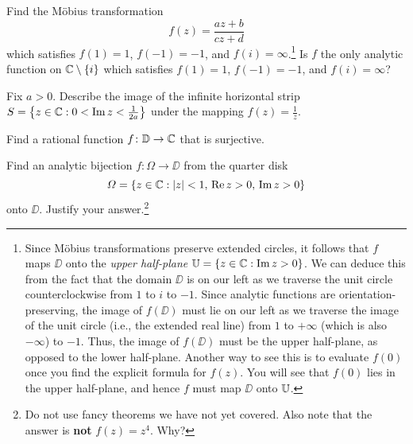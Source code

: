 \documentclass{../math135}
\begin{document}
\begin{exercise}
	Find the M\"obius transformation
  \[
    f(z) = \frac{az+b}{cz+d}
  \]
  which satisfies \(f(1) = 1\), \(f(-1) = -1\), and
  \(f(i) = \infty\).\footnote{Since M\"obius transformations preserve
    extended circles, it follows that \(f\) maps \(\DD\) onto the
    \emph{upper half-plane} \(\UU = \{z \in \CC: \Im z > 0\}\).  We
    can deduce this from the fact that the domain \(\DD\) is on our
    left as we traverse the unit circle counterclockwise from \(1\) to
    \(i\) to \(-1\).  Since analytic functions are
    orientation-preserving, the image of \(f(\DD)\) must lie on our
    left as we traverse the image of the unit circle (i.e., the
    extended real line) from \(1\) to \(+\infty\) (which is also
    \(-\infty\)) to \(-1\).  Thus, the image of \(f(\DD)\) must be the
    upper half-plane, as opposed to the lower half-plane.  Another way
    to see this is to evaluate \(f(0)\) once you find the explicit
    formula for \(f(z)\).  You will see that \(f(0)\) lies in the
    upper half-plane, and hence \(f\) must map \(\DD\) onto \(\UU\).}
  Is \(f\) the only analytic function on \(\CC \setminus \set i\)
  which satisfies \(f(1) = 1\), \(f(-1) = -1\), and \(f(i) = \infty\)?

  \begin{solution}
  \end{solution}

\end{exercise}

\begin{exercise}
	Fix \(a > 0\).  Describe the image of the infinite horizontal strip
  \(S= \set*{z \in \CC : 0 < \Im z < \frac{1}{2a}}\) under the mapping
  \(f(z) = \frac 1 z\).

  \begin{solution}
  \end{solution}

\end{exercise}

\begin{exercise}
	Find a rational function \(f \colon \DD\to\CC\) that is surjective.

  \begin{solution}
  \end{solution}

\end{exercise}

\begin{exercise}
	Find an analytic bijection \(f \colon \Omega\to\DD\) from the
  quarter disk
  \[
		\Omega = \set*{ z \in \CC
      : \abs z < 1, \, \Re z > 0, \, \Im z > 0 }
  \]
	onto \(\DD\).  Justify your answer.\footnote{Do not use fancy
    theorems we have not yet covered.  Also note that the answer is
    \textbf{not} \(f(z)=z^4\).  Why?}

  \begin{solution}
  \end{solution}

\end{exercise}
\end{document}
